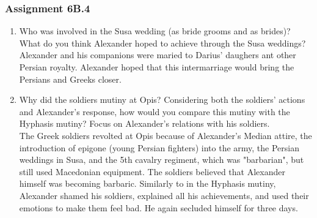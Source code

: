 \documentclass{article}
\begin{document}
\subsubsection*{Assignment 6B.4}
\begin{enumerate}
  \item Who was involved in the Susa wedding (as bride grooms and as brides)? What do
  you think Alexander hoped to achieve through the Susa weddings? \\
  Alexander and his companions were maried to Darius' daughers ant other Persian royalty.
  Alexander hoped that this intermarriage would bring the Persians and Greeks closer.
  \item Why did the soldiers mutiny at Opis? Considering both the soldiers’ actions and
  Alexander’s response, how would you compare this mutiny with the Hyphasis mutiny?
  Focus on Alexander’s relations with his soldiers. \\
  The Greek soldiers revolted at Opis because of Alexander's Median attire, the introduction
  of epigone (young Persian fighters) into the army, the Persian weddings in Susa, and the 5th
  cavalry regiment, which was "barbarian", but still used Macedonian equipment. The soldiers
  believed that Alexander himself was becoming barbaric. Similarly to in the Hyphasis mutiny,
  Alexander shamed his soldiers, explained all his achievements, and used their emotions
  to make them feel bad. He again secluded himself for three days.
\end{enumerate}
\end{document}
